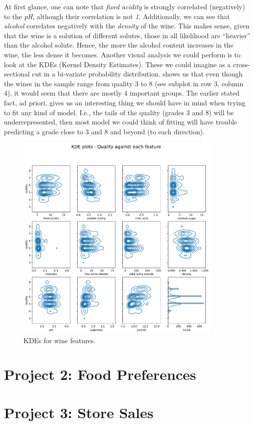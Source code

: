 \documentclass[11pt]{article}
\begin{document}
At first glance, one can note that \emph{fixed acidity} is strongly correlated (negatively) to the \emph{pH},
although their correlation is not \emph{1}.
Additionally, we can see that \emph{alcohol} correlates negatively with the \emph{density} of the wine.
This makes sense, given that the wine is a solution of different solutes, those in all likelihood are ``heavier''
than the alcohol solute.
Hence, the more the alcohol content increases in the wine, the less dense it becomes.
\vspace{2pt}
Another visual analysis we could perform is to look at the KDEs (Kernel Density Estimates).
These we could imagine as a cross-sectional cut in a bi-variate probability distribution.
 shows us that even though the wines in the sample range from quality 3 to 8
(see subplot in row 3, column 4), it would seem that there are mostly 4 important groups.
The earlier stated fact, ad priori, gives us an interesting thing we should have in mind when trying
to fit any kind of model.
I.e., the tails of the quality (grades 3 and 8) will be underrepresented, then most model we could think
of fitting will have trouble predicting a grade close to 3 and 8 and beyond (to each direction).

\begin{figure}[h!]
    \includegraphics[width=0.9\textwidth]{figs/wine_kde}
    \caption{KDEs for wine features.}
    \label{fig:wine_kdes}
\end{figure}

\newpage
\part[food]{Project 2: Food Preferences}


\newpage
\part[stores]{Project 3: Store Sales}
\end{document}
